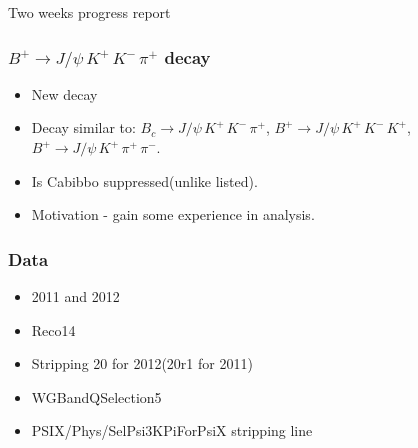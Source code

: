 \documentclass{beamer}
\begin{document}

\begin{frame}
\Huge{\centerline{Two weeks progress report}}
\end{frame}


\begin{frame}
\frametitle{$B^+ \to J/\psi \, K^+ \, K^- \, \pi^+$ decay}
\begin{itemize}
\item New decay
\item Decay similar to: $B_{c} \to J/\psi \, K^+ \, K^- \, \pi^+$, $B^+ \to J/\psi \, K^+ \, K^- \, K^+$, $B^+ \to J/\psi \, K^+ \, \pi^+ \, \pi^-$.
\item Is Cabibbo suppressed(unlike listed).
\item Motivation - gain some experience in analysis.
\end{itemize}
\end{frame}



\begin{frame}
\frametitle{Data}
\begin{itemize}
\item 2011 and 2012
\item Reco14
\item Stripping 20 for 2012(20r1 for 2011)
\item WGBandQSelection5
\item PSIX/Phys/SelPsi3KPiForPsiX stripping line
\end{itemize}
\end{frame}


\end{document}
